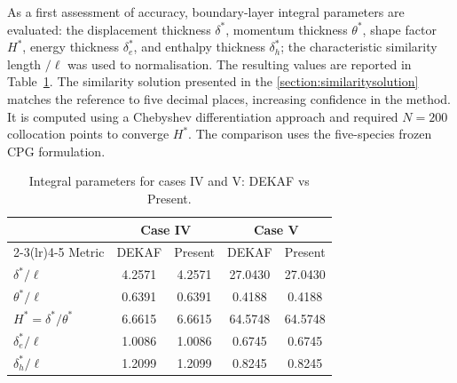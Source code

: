 As a first assessment of accuracy, boundary-layer integral parameters are evaluated: the displacement thickness $\delta^*$, momentum thickness $\theta^*$, shape factor $H^*$, energy thickness $\delta_e^*$, and enthalpy thickness $\delta_h^*$; the characteristic similarity length $/\ell$ was used to normalisation. The resulting values are reported in Table~\ref{tab:integral_params_compare_iv_v}. The similarity solution presented in the \cref{section:similaritysolution} matches the reference to five decimal places, increasing confidence in the method. It is computed using a Chebyshev differentiation approach and required $N=200$ collocation points to converge $H^*$. The comparison uses the five-species frozen \gls{CPG} formulation.

\begin{table}[t]
  \centering
  \caption{Integral parameters for cases IV and V: DEKAF vs Present.}
  \label{tab:integral_params_compare_iv_v}
  \setlength{\tabcolsep}{6pt}
  \small
  \begin{tabular}{@{}lcccc@{}}
    \toprule
    & \multicolumn{2}{c}{Case IV} & \multicolumn{2}{c}{Case V} \\
    \cmidrule(lr){2-3}\cmidrule(lr){4-5}
    Metric & DEKAF & Present & DEKAF & Present \\
    \midrule
    $\delta^*/\ell$        & 4.2571  & 4.2571  & 27.0430 & 27.0430 \\
    $\theta^*/\ell$        & 0.6391  & 0.6391  & 0.4188  & 0.4188  \\
    $H^*=\delta^*/\theta^*$& 6.6615  & 6.6615  & 64.5748 & 64.5748 \\
    $\delta_e^*/\ell$      & 1.0086  & 1.0086  & 0.6745  & 0.6745  \\
    $\delta_h^*/\ell$      & 1.2099  & 1.2099  & 0.8245  & 0.8245  \\
    \bottomrule
  \end{tabular}
\end{table}


